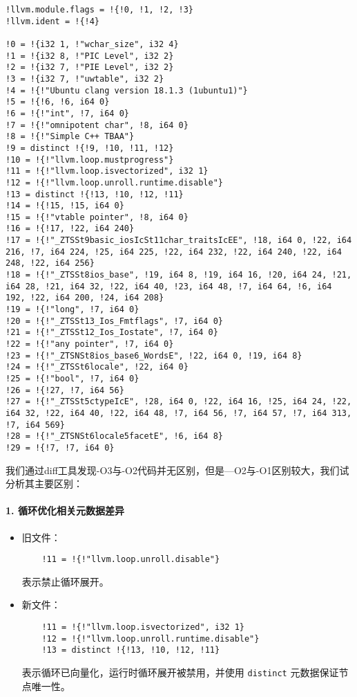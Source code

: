 \documentclass[UTF8,a4paper,10pt]{ctexart}
\begin{document}
\begin{lstlisting}[title=O2优化,frame=trbl]
!llvm.module.flags = !{!0, !1, !2, !3}
!llvm.ident = !{!4}

!0 = !{i32 1, !"wchar_size", i32 4}
!1 = !{i32 8, !"PIC Level", i32 2}
!2 = !{i32 7, !"PIE Level", i32 2}
!3 = !{i32 7, !"uwtable", i32 2}
!4 = !{!"Ubuntu clang version 18.1.3 (1ubuntu1)"}
!5 = !{!6, !6, i64 0}
!6 = !{!"int", !7, i64 0}
!7 = !{!"omnipotent char", !8, i64 0}
!8 = !{!"Simple C++ TBAA"}
!9 = distinct !{!9, !10, !11, !12}
!10 = !{!"llvm.loop.mustprogress"}
!11 = !{!"llvm.loop.isvectorized", i32 1}
!12 = !{!"llvm.loop.unroll.runtime.disable"}
!13 = distinct !{!13, !10, !12, !11}
!14 = !{!15, !15, i64 0}
!15 = !{!"vtable pointer", !8, i64 0}
!16 = !{!17, !22, i64 240}
!17 = !{!"_ZTSSt9basic_iosIcSt11char_traitsIcEE", !18, i64 0, !22, i64 216, !7, i64 224, !25, i64 225, !22, i64 232, !22, i64 240, !22, i64 248, !22, i64 256}
!18 = !{!"_ZTSSt8ios_base", !19, i64 8, !19, i64 16, !20, i64 24, !21, i64 28, !21, i64 32, !22, i64 40, !23, i64 48, !7, i64 64, !6, i64 192, !22, i64 200, !24, i64 208}
!19 = !{!"long", !7, i64 0}
!20 = !{!"_ZTSSt13_Ios_Fmtflags", !7, i64 0}
!21 = !{!"_ZTSSt12_Ios_Iostate", !7, i64 0}
!22 = !{!"any pointer", !7, i64 0}
!23 = !{!"_ZTSNSt8ios_base6_WordsE", !22, i64 0, !19, i64 8}
!24 = !{!"_ZTSSt6locale", !22, i64 0}
!25 = !{!"bool", !7, i64 0}
!26 = !{!27, !7, i64 56}
!27 = !{!"_ZTSSt5ctypeIcE", !28, i64 0, !22, i64 16, !25, i64 24, !22, i64 32, !22, i64 40, !22, i64 48, !7, i64 56, !7, i64 57, !7, i64 313, !7, i64 569}
!28 = !{!"_ZTSNSt6locale5facetE", !6, i64 8}
!29 = !{!7, !7, i64 0}

\end{lstlisting}

我们通过diff工具发现-O3与-O2代码并无区别，但是—O2与-O1区别较大，我们试分析其主要区别：


\paragraph{1. 循环优化相关元数据差异}
\begin{itemize}
    \item 旧文件：
    \begin{verbatim}
    !11 = !{!"llvm.loop.unroll.disable"}
    \end{verbatim}
    表示禁止循环展开。

    \item 新文件：
    \begin{verbatim}
    !11 = !{!"llvm.loop.isvectorized", i32 1}
    !12 = !{!"llvm.loop.unroll.runtime.disable"}
    !13 = distinct !{!13, !10, !12, !11}
    \end{verbatim}
    表示循环已向量化，运行时循环展开被禁用，并使用 \texttt{distinct} 元数据保证节点唯一性。
\end{itemize}
\end{document}
